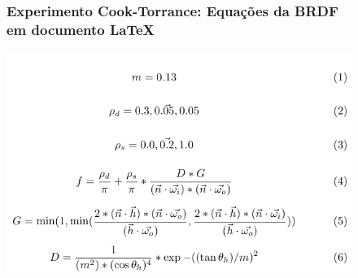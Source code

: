 

\begin{frame}
\begin{figure}
    \frametitle{Experimento Cook-Torrance: Equações da BRDF em documento \LaTeX{}}
    \begin{center}
        \includegraphics[scale=0.62]{./Imagens/brdfs/cook-torrance.pdf}
    \end{center}
\end{figure}
\end{frame}

